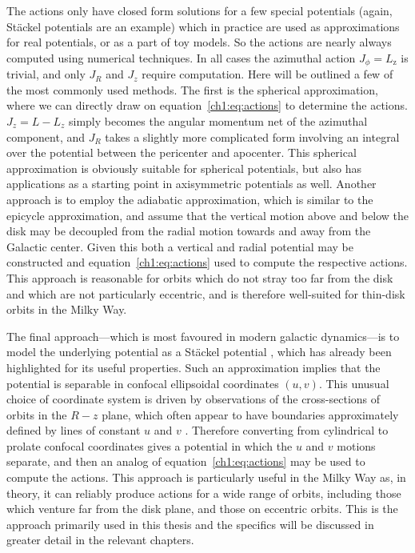The actions only have closed form solutions for a few special potentials (again, St\"{a}ckel potentials are an example) which in practice are used as approximations for real potentials, or as a part of toy models. So the actions are nearly always computed using numerical techniques. In all cases the azimuthal action $J_{\phi} = L_\mathrm{z}$ is trivial, and only $J_{R}$ and $J_{z}$ require computation. Here will be outlined a few of the most commonly used methods. The first is the spherical approximation, where we can directly draw on equation~\ref{ch1:eq:actions} to determine the actions. $J_{z} = L - L_{z}$ simply becomes the angular momentum net of the azimuthal component, and $J_{R}$ takes a slightly more complicated form involving an integral over the potential between the pericenter and apocenter. This spherical approximation is obviously suitable for spherical potentials, but also has applications as a starting point in axisymmetric potentials as well. Another approach is to employ the adiabatic approximation, which is similar to the epicycle approximation, and assume that the vertical motion above and below the disk may be decoupled from the radial motion towards and away from the Galactic center. Given this both a vertical and radial potential may be constructed and equation~\ref{ch1:eq:actions} used to compute the respective actions. This approach is reasonable for orbits which do not stray too far from the disk and which are not particularly eccentric, and is therefore well-suited for thin-disk orbits in the Milky Way.

The final approach---which is most favoured in modern galactic dynamics---is to model the underlying potential as a St\"{a}ckel potential \parencite{binney12}, which has already been highlighted for its useful properties. Such an approximation implies that the potential is separable in confocal ellipsoidal coordinates $(u,v)$. This unusual choice of coordinate system is driven by observations of the cross-sections of orbits in the $R-z$ plane, which often appear to have boundaries approximately defined by lines of constant $u$ and $v$ \parencite[see figure 3.27 in ][]{binney08}. Therefore converting from cylindrical to prolate confocal coordinates gives a potential in which the $u$ and $v$ motions separate, and then an analog of equation~\eqref{ch1:eq:actions} may be used to compute the actions. This approach is particularly useful in the Milky Way as, in theory, it can reliably produce actions for a wide range of orbits, including those which venture far from the disk plane, and those on eccentric orbits. This is the approach primarily used in this thesis and the specifics will be discussed in greater detail in the relevant chapters.

